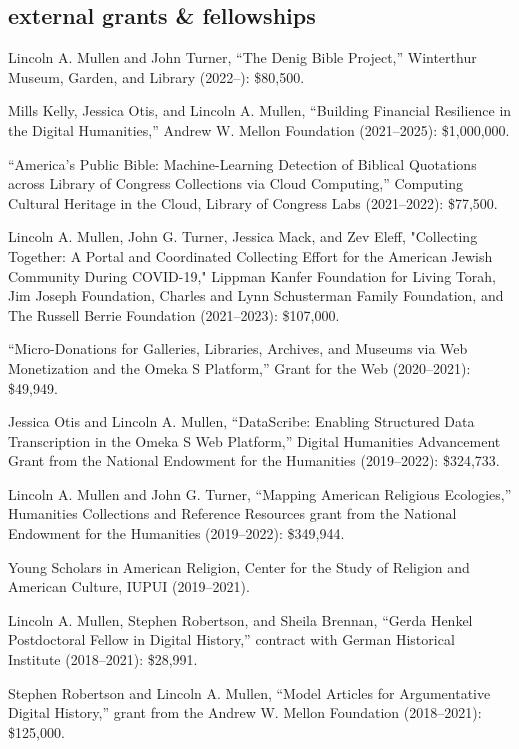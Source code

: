 \documentclass[11pt]{article}
\begin{document}
\subsection{external grants \& fellowships}\label{grants-and-fellowships}

Lincoln A. Mullen and John Turner, ``The Denig Bible Project,'' Winterthur Museum, Garden, and Library (2022--): \$80,500.

Mills Kelly, Jessica Otis, and Lincoln A. Mullen, ``Building Financial Resilience in the Digital Humanities,'' Andrew W. Mellon Foundation (2021--2025): \$1,000,000.

``America's Public Bible: Machine-Learning Detection of Biblical Quotations across Library of Congress Collections via Cloud Computing,'' Computing Cultural Heritage in the Cloud, Library of Congress Labs (2021--2022): \$77,500.

Lincoln A. Mullen, John G. Turner, Jessica Mack, and Zev Eleff, "Collecting Together: A Portal and Coordinated Collecting Effort for the American Jewish Community During COVID-19," Lippman Kanfer Foundation for Living Torah, Jim Joseph Foundation, Charles and Lynn Schusterman Family Foundation, and The Russell Berrie Foundation (2021--2023): \$107,000.

``Micro-Donations for Galleries, Libraries, Archives, and
Museums via Web Monetization and the Omeka S Platform,'' Grant for the Web
(2020--2021): \$49,949.

Jessica Otis and Lincoln A. Mullen, ``DataScribe: Enabling Structured Data Transcription in the Omeka S Web
Platform,'' Digital Humanities Advancement Grant from the National Endowment for the Humanities (2019--2022): \$324,733.

Lincoln A. Mullen and John G. Turner, ``Mapping American Religious Ecologies,'' Humanities Collections and Reference Resources grant from the National Endowment for the Humanities (2019--2022): \$349,944.

Young Scholars in American Religion, Center for the Study of Religion and American Culture, IUPUI (2019--2021).

Lincoln A. Mullen, Stephen Robertson, and Sheila Brennan, ``Gerda Henkel Postdoctoral Fellow in Digital History,'' contract with German Historical Institute (2018--2021): \$28,991.

Stephen Robertson and Lincoln A. Mullen, ``Model Articles for Argumentative Digital History,'' grant from the Andrew W. Mellon Foundation (2018--2021): \$125,000.
\end{document}
